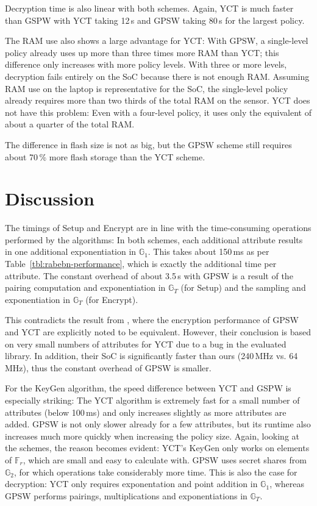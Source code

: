 Decryption time is also linear with both schemes.
Again, YCT is much faster than GSPW with YCT taking 12\,s and GPSW taking 80\,s for the largest policy.

The RAM use also shows a large advantage for YCT:
With GPSW, a single-level policy already uses up more than three times more RAM than YCT; this difference only increases with more policy levels.
With three or more levels, decryption fails entirely on the SoC because there is not enough RAM.
Assuming RAM use on the laptop is representative for the SoC, the single-level policy already requires more than two thirds of the total RAM on the sensor.
YCT does not have this problem: Even with a four-level policy, it uses only the equivalent of about a quarter of the total RAM.

The difference in flash size is not as big, but the GPSW scheme still requires about 70\,\% more flash storage than the YCT scheme.


\section{Discussion}
The timings of Setup and Encrypt are in line with the time-consuming operations performed by the algorithms: 
In both schemes, each additional attribute results in one additional exponentiation in $\mathbb{G}_1$.
This takes about 150\,ms as per Table~\ref{tbl:rabebn-performance}, which is exactly the additional time per attribute.
The constant overhead of about 3.5\,s with GPSW is a result of the pairing computation and exponentiation in $\mathbb{G}_T$ (for Setup) and the sampling and exponentiation in $\mathbb{G}_T$ (for Encrypt).

This contradicts the result from \cite{girgenti_feasibility_2019}, where the encryption performance of GPSW and YCT are explicitly noted to be equivalent.
However, their conclusion is based on very small numbers of attributes for YCT due to a bug in the evaluated library.
In addition, their SoC is significantly faster than ours (240\,MHz vs. 64\,MHz), thus the constant overhead of GPSW is smaller.

For the KeyGen algorithm, the speed difference between YCT and GSPW is especially striking: 
The YCT algorithm is extremely fast for a small number of attributes (below 100\,ms) and only increases slightly as more attributes are added.
GPSW is not only slower already for a few attributes, but its runtime also increases much more quickly when increasing the policy size.
Again, looking at the schemes, the reason becomes evident: YCT's KeyGen only works on elements of $\mathbb{F}_r$, which are small and easy to calculate with.
GPSW uses secret shares from $\mathbb{G}_2$, for which operations take considerably more time.
This is also the case for decryption: YCT only requires exponentation and point addition in $\mathbb{G}_1$, whereas GPSW performs pairings, multiplications and exponentiations in $\mathbb{G}_T$.

